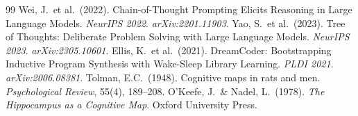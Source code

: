 \documentclass[11pt]{article}
\begin{document}
\begin{thebibliography}{99}
 Wei, J.\ et al.\ (2022). Chain-of-Thought Prompting Elicits Reasoning in Large Language Models. \textit{NeurIPS 2022}. \textit{arXiv:2201.11903}.
 Yao, S.\ et al.\ (2023). Tree of Thoughts: Deliberate Problem Solving with Large Language Models. \textit{NeurIPS 2023}. \textit{arXiv:2305.10601}.
 Ellis, K.\ et al.\ (2021). DreamCoder: Bootstrapping Inductive Program Synthesis with Wake-Sleep Library Learning. \textit{PLDI 2021}. \textit{arXiv:2006.08381}.
 Tolman, E.C.\ (1948). Cognitive maps in rats and men. \textit{Psychological Review}, 55(4), 189--208.
 O'Keefe, J.\ \& Nadel, L.\ (1978). \textit{The Hippocampus as a Cognitive Map}. Oxford University Press.
\end{thebibliography}
\end{document}
